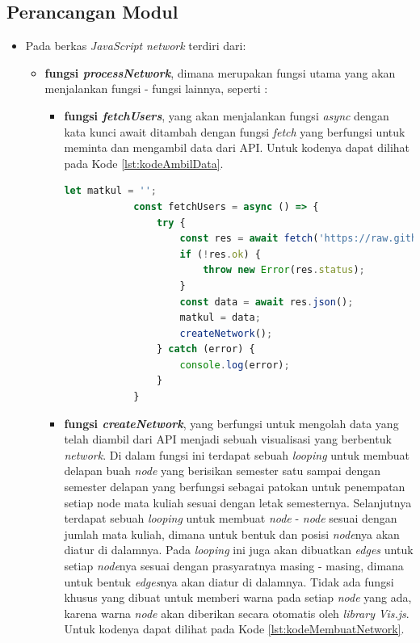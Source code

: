 \subsection{Perancangan Modul}
\begin{itemize}
    \item Pada berkas \textit{JavaScript} \textit{network} terdiri dari:
    \begin{itemize}
        \item \textbf{fungsi \textit{processNetwork}}, dimana merupakan fungsi utama yang akan menjalankan fungsi - fungsi lainnya, seperti :
        \begin{itemize}
            \item \textbf{fungsi \textit{fetchUsers}}, yang akan menjalankan fungsi \textit{async} dengan kata kunci await ditambah dengan fungsi \textit{fetch} yang berfungsi untuk meminta dan mengambil data dari API.
            Untuk kodenya dapat dilihat pada Kode \ref{lst:kodeAmbilData}.
            
            \newpage
            \begin{lstlisting}[language=JavaScript, caption=Kode pengambilan data dari API\label{lst:kodeAmbilData}]
            let matkul = '';
            const fetchUsers = async () => {
                try {
                    const res = await fetch('https://raw.githubusercontent.com/ftisunpar/data/master/prasyarat.json');
                    if (!res.ok) {
                        throw new Error(res.status);
                    }
                    const data = await res.json();
                    matkul = data;
                    createNetwork();
                } catch (error) {
                    console.log(error);
                }
            }
            \end{lstlisting}
            
            \item \textbf{fungsi \textit{createNetwork}}, yang berfungsi untuk mengolah data yang telah diambil dari API menjadi sebuah visualisasi yang berbentuk \textit{network}. Di dalam fungsi ini terdapat sebuah \textit{looping} untuk membuat delapan buah \textit{node} yang berisikan semester satu sampai dengan semester delapan yang berfungsi sebagai patokan untuk penempatan setiap node mata kuliah sesuai dengan letak semesternya. Selanjutnya terdapat sebuah \textit{looping} untuk membuat \textit{node} - \textit{node} sesuai dengan jumlah mata kuliah, dimana untuk bentuk dan posisi \textit{node}nya akan diatur di dalamnya. Pada \textit{looping} ini juga akan dibuatkan \textit{edges} untuk setiap \textit{node}nya sesuai dengan prasyaratnya masing - masing, dimana untuk bentuk \textit{edges}nya akan diatur di dalamnya. Tidak ada fungsi khusus yang dibuat untuk memberi warna pada setiap \textit{node} yang ada, karena warna \textit{node} akan diberikan secara otomatis oleh \textit{library} \textit{Vis.js}. Untuk kodenya dapat dilihat pada Kode \ref{lst:kodeMembuatNetwork}.
            

\end{itemize}
\end{itemize}
\end{itemize}
